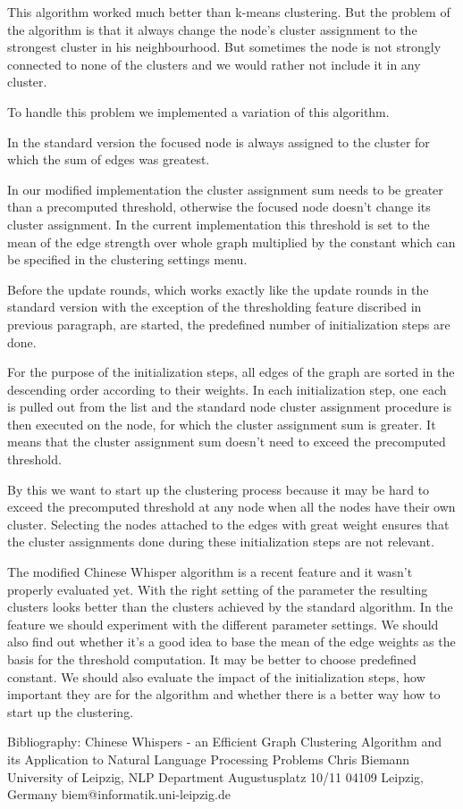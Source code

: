 This algorithm worked much better than k-means clustering. But the problem of the algorithm is that it always change the node's cluster assignment to the strongest cluster in his neighbourhood. But sometimes the node is not strongly connected to none of the clusters and we would rather not include it in any cluster.

To handle this problem we implemented a variation of this algorithm. 

In the standard version the focused node is always assigned to the cluster for which the sum of edges was greatest. 

In our modified implementation the cluster assignment sum needs to be greater than a precomputed threshold, otherwise the focused node doesn't change its cluster assignment. In the current implementation this threshold is set to the mean of the edge strength over whole graph multiplied by the constant which can be specified in the clustering settings menu.

Before the update rounds, which works exactly like the update rounds in the standard version with the exception of the thresholding feature discribed in previous paragraph, are started, the predefined number of initialization steps are done.

For the purpose of the initialization steps, all edges of the graph are sorted in the descending order according to their weights. In each initialization step, one each is pulled out from the list and the standard node cluster assignment procedure is then executed on the node, for which the cluster assignment sum is greater. It means that the cluster assignment sum doesn't need to exceed the precomputed threshold.

By this we want to start up the clustering process because it may be hard to exceed the precomputed threshold at any node when all the nodes have their own cluster. Selecting the nodes attached to the edges with great weight ensures that the cluster assignments done during these initialization steps are not relevant.

The modified Chinese Whisper algorithm is a recent feature and it wasn't properly evaluated yet. With the right setting of the parameter the resulting clusters looks better than the clusters achieved by the standard algorithm. In the feature we should experiment with the different parameter settings. We should also find out whether it's a good idea to base the mean of the edge weights as the basis for the threshold computation. It may be better to choose predefined constant. We should also evaluate the impact of the initialization steps, how important they are for the algorithm and whether there is a better way how to start up the clustering.

Bibliography:
Chinese Whispers - an Efficient Graph Clustering Algorithm
and its Application to Natural Language Processing Problems
                            Chris Biemann
                University of Leipzig, NLP Department
                         Augustusplatz 10/11
                      04109 Leipzig, Germany
              biem@informatik.uni-leipzig.de


